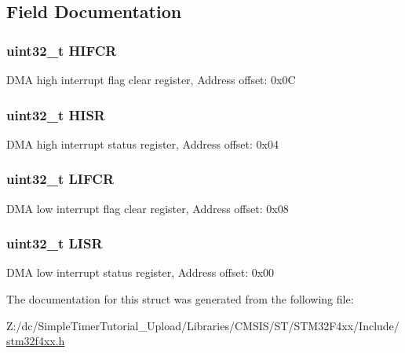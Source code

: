 \subsection{Field Documentation}
\hypertarget{struct_d_m_a___type_def_ac55c27aeea4107813c1e7da3fcf46961}{
\subsubsection[{H\-I\-F\-C\-R}]{ uint32\-\_\-t H\-I\-F\-C\-R}}\label{struct_d_m_a___type_def_ac55c27aeea4107813c1e7da3fcf46961}
D\-M\-A high interrupt flag clear register, Address offset\-: 0x0\-C \hypertarget{struct_d_m_a___type_def_a6fe40f7ac1a18c2726b328b5ec02b262}{
\subsubsection[{H\-I\-S\-R}]{ uint32\-\_\-t H\-I\-S\-R}}\label{struct_d_m_a___type_def_a6fe40f7ac1a18c2726b328b5ec02b262}
D\-M\-A high interrupt status register, Address offset\-: 0x04 \hypertarget{struct_d_m_a___type_def_ac4f7bf4cb172024bfc940c00167cd04e}{
\subsubsection[{L\-I\-F\-C\-R}]{ uint32\-\_\-t L\-I\-F\-C\-R}}\label{struct_d_m_a___type_def_ac4f7bf4cb172024bfc940c00167cd04e}
D\-M\-A low interrupt flag clear register, Address offset\-: 0x08 \hypertarget{struct_d_m_a___type_def_a5cdef358e9e95b570358e1f6a3a7f492}{
\subsubsection[{L\-I\-S\-R}]{ uint32\-\_\-t L\-I\-S\-R}}\label{struct_d_m_a___type_def_a5cdef358e9e95b570358e1f6a3a7f492}
D\-M\-A low interrupt status register, Address offset\-: 0x00 

The documentation for this struct was generated from the following file\-:\begin{DoxyCompactItemize}
\item 
Z\-:/dc/\-Simple\-Timer\-Tutorial\-\_\-\-Upload/\-Libraries/\-C\-M\-S\-I\-S/\-S\-T/\-S\-T\-M32\-F4xx/\-Include/\hyperlink{stm32f4xx_8h}{stm32f4xx.\-h}\end{DoxyCompactItemize}
